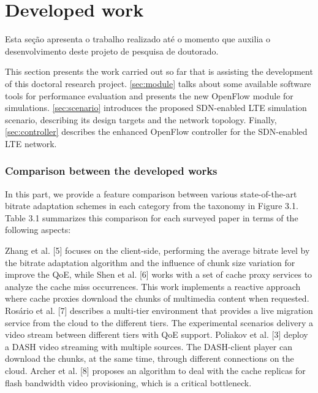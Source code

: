 \clearpage
\section{Developed work}
\label{ch:developed}

Esta seção apresenta o trabalho realizado até o momento que auxilia o desenvolvimento 
deste projeto de pesquisa de doutorado. 

This section presents the work carried out so far that is assisting the
development of this doctoral research project. \autoref{sec:module} talks about
some available software tools for performance evaluation and presents the new
OpenFlow module for simulations. \autoref{sec:scenario} introduces the proposed
\ac{SDN}-enabled \ac{LTE} simulation scenario, describing its design targets
and the network topology. Finally, \autoref{sec:controller} describes the
enhanced OpenFlow controller for the \ac{SDN}-enabled \ac{LTE} network.


\subsubsection{Comparison between the developed works}
\label{subsec:applications}

In this part, we provide a feature comparison between various state-of-the-art bitrate
adaptation schemes in each category from the taxonomy in Figure 3.1. Table 3.1 summarizes
this comparison for each surveyed paper in terms of the following aspects:


Zhang et al. [5] focuses on the client-side, performing the average bitrate level by the bitrate
adaptation algorithm and the influence of chunk size variation for improve the QoE, while Shen et
al. [6] works with a set of cache proxy services to analyze the cache miss occurrences. This
work implements a reactive approach where cache proxies download the chunks of multimedia
content when requested. Rosário et al. [7] describes a multi-tier environment that provides a live
migration service from the cloud to the different tiers. The experimental scenarios delivery a
video stream between different tiers with QoE support. Poliakov et al. [3] deploy a DASH video
streaming with multiple sources. The DASH-client player can download the chunks, at the same
time, through different connections on the cloud. Archer et al. [8] proposes an algorithm to deal
with the cache replicas for flash bandwidth video provisioning, which is a critical bottleneck.

